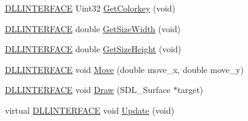 \begin{DoxyCompactItemize}
\hyperlink{_s_d_l__ep_8h_a38dd54df4631b4daf553096353d7b20b}{D\-L\-L\-I\-N\-T\-E\-R\-F\-A\-C\-E} Uint32 \hyperlink{classc_basic_sprite_ac65bd80f0a119e7725a8c5a7b3c6cd76}{Get\-Colorkey} (void)
\item 
\hyperlink{_s_d_l__ep_8h_a38dd54df4631b4daf553096353d7b20b}{D\-L\-L\-I\-N\-T\-E\-R\-F\-A\-C\-E} double \hyperlink{classc_basic_sprite_ab1bcf20754f518516e0447d6472ed031}{Get\-Size\-Width} (void)
\item 
\hyperlink{_s_d_l__ep_8h_a38dd54df4631b4daf553096353d7b20b}{D\-L\-L\-I\-N\-T\-E\-R\-F\-A\-C\-E} double \hyperlink{classc_basic_sprite_a379b935a8a0ac5a671f100c4501b1519}{Get\-Size\-Height} (void)
\item 
\hyperlink{_s_d_l__ep_8h_a38dd54df4631b4daf553096353d7b20b}{D\-L\-L\-I\-N\-T\-E\-R\-F\-A\-C\-E} void \hyperlink{classc_basic_sprite_a8ef384a01431f3cff6dffe00df1df2d8}{Move} (double move\-\_\-x, double move\-\_\-y)
\item 
\hyperlink{_s_d_l__ep_8h_a38dd54df4631b4daf553096353d7b20b}{D\-L\-L\-I\-N\-T\-E\-R\-F\-A\-C\-E} void \hyperlink{classc_basic_sprite_a399efb7b91ed116bc0882abdcdc50597}{Draw} (S\-D\-L\-\_\-\-Surface $\ast$target)
\item 
virtual \hyperlink{_s_d_l__ep_8h_a38dd54df4631b4daf553096353d7b20b}{D\-L\-L\-I\-N\-T\-E\-R\-F\-A\-C\-E} void \hyperlink{classc_basic_sprite_a6f01984a6af849dc95cc9ec1f3528074}{Update} (void)
\end{DoxyCompactItemize}

